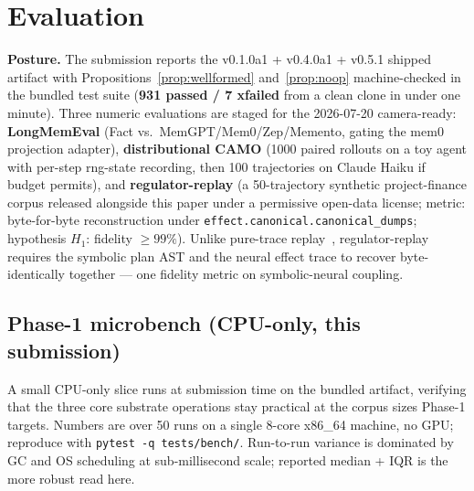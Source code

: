 \documentclass[anon]{nesy2026}   %
\newcommand{\C}[1]{\texttt{#1}}
\begin{document}
\section{Evaluation}\label{sec:eval}

\textbf{Posture.} The submission reports the v0.1.0a1 + v0.4.0a1 + v0.5.1 shipped artifact with Propositions~\ref{prop:wellformed} and~\ref{prop:noop} machine-checked in the bundled test suite (\textbf{931 passed / 7 xfailed} from a clean clone in under one minute). Three numeric evaluations are staged for the 2026-07-20 camera-ready: \textbf{LongMemEval} (Fact vs.~MemGPT/Mem0/Zep/Memento, gating the mem0 projection adapter), \textbf{distributional CAMO} (1000 paired rollouts on a toy agent with per-step rng-state recording, then 100 trajectories on Claude Haiku if budget permits), and \textbf{regulator-replay} (a 50-trajectory synthetic project-finance corpus released alongside this paper under a permissive open-data license; metric: byte-for-byte reconstruction under \C{effect.canonical.canonical\_dumps}; hypothesis $H_1$: fidelity $\geq 99\%$). Unlike pure-trace replay~\citep{anon2026camo,anon2026agenther}, regulator-replay requires the symbolic plan AST and the neural effect trace to recover byte-identically together --- one fidelity metric on symbolic-neural coupling.

\subsection{Phase-1 microbench (CPU-only, this submission)}\label{sec:eval-microbench}

A small CPU-only slice runs at submission time on the bundled artifact, verifying that the three core substrate operations stay practical at the corpus sizes Phase-1 targets. Numbers are over 50 runs on a single 8-core x86\_64 machine, no GPU; reproduce with \C{pytest -q tests/bench/}. Run-to-run variance is dominated by GC and OS scheduling at sub-millisecond scale; reported median + IQR is the more robust read here.
\end{document}
